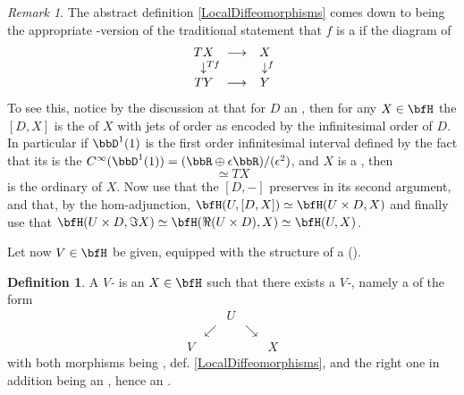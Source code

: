 \documentclass[12pt,titlepage]{article}
\def\mathrlap{\mathpalette\mathrlapinternal}
\def\mathrlapinternal#1#2{\rlap{$\mathsurround=0pt#1{#2}$}}
\newcommand{\itexarray}[1]{\begin{matrix}#1\end{matrix}}
\theoremstyle{plain}
\theoremstyle{definition}
\newtheorem{defn}{Definition}
\theoremstyle{remark}
\newtheorem{remark}{Remark}
\begin{document}
\begin{remark}
\label{}\hypertarget{}{}
The abstract definition \ref{LocalDiffeomorphisms} comes down to being the appropriate -version of the traditional statement that $f$ is a  if the diagram of 
\begin{displaymath}
\itexarray{
T X &\longrightarrow& X
\\
\downarrow^{\mathrlap{T f}} && \downarrow^{\mathrlap{f}}
\\
T Y &\longrightarrow& Y
}
\end{displaymath}
To see this, notice by the discussion at  that for $D$ an , then for any $X \in \bfH$ the  $[D,X]$ is the  of $X$ with jets of order as encoded by the infinitesimal order of $D$. In particular if $\bbD^1(1)$ is the first order infinitesimal interval defined by the fact that its  is the  $C^\infty(\bbD^1(1)) = (\bbR \oplus \epsilon \bbR)/(\epsilon^2)$, and $X$ is a , then
\begin{displaymath}
[\bbD^1(1), X]\simeq T X
\end{displaymath}
is the ordinary  of $X$. Now use that the  $[D,-]$ preserves  in its second argument, and that, by the hom-adjunction, $\bfH(U, [D,X]) \simeq \bfH(U \times D, X)$ and finally use that $\bfH(U \times D, \Im X)\simeq \bfH(\Re(U \times D), X)\simeq \bfH(U,X)$.
\end{remark}
Let now $V \in \bfH$ be given, equipped with the structure of a  ().
\begin{defn}
\label{VManifold}\hypertarget{VManifold}{}
A \emph{$V$-} is an $X \in \bfH$ such that there exists a \emph{$V$-}, namely a  of the form
\begin{displaymath}
\itexarray{
&& U
\\
& \swarrow && \searrow
\\
V && && X
}
\end{displaymath}
with both morphisms being , def. \ref{LocalDiffeomorphisms}, and the right one in addition being an , hence an .
\end{defn}
\end{document}
